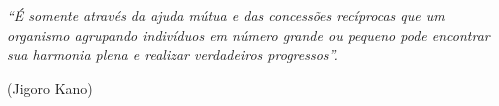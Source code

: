 \begin{epigrafe}
    \vspace*{\fill}
	\begin{flushright}
		\begin{minipage}{.5\textwidth}
			\textit{``É somente através da ajuda mútua e das concessões recíprocas que um organismo agrupando indivíduos em número grande ou pequeno pode encontrar sua harmonia plena e realizar verdadeiros progressos''.}
			\begin{flushright}
				(Jigoro Kano)
			\end{flushright}
		\end{minipage}
	\end{flushright}
\end{epigrafe}

